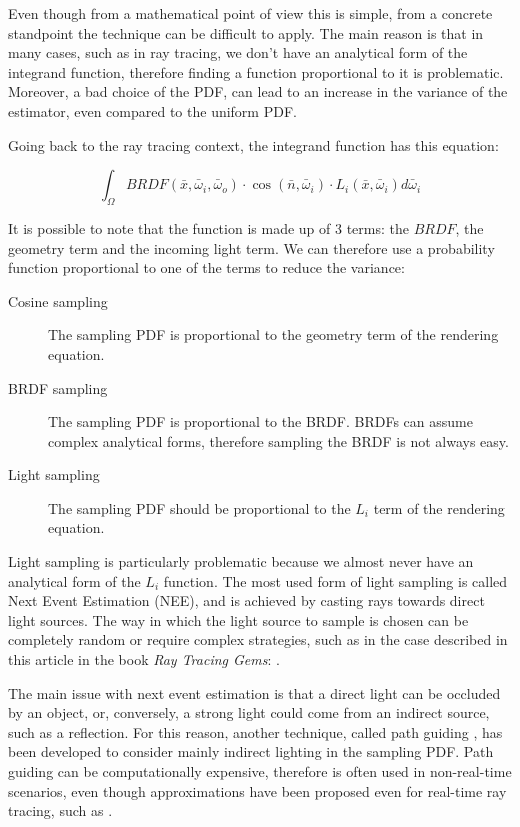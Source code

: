 \documentclass{PoliMi_MasterThesis}
\begin{document}
Even though from a mathematical point of view this is simple, from a concrete standpoint the technique can be difficult to apply. The main reason is that in many cases, such as in ray tracing, we don't have an analytical form of the integrand function, therefore finding a function proportional to it is problematic. Moreover, a bad choice of the PDF, can lead to an increase in the variance of the estimator, even compared to the uniform PDF.

Going back to the ray tracing context, the integrand function has this equation:

$$\int_\Omega BRDF(\bar{x}, \bar{\omega}_i, \bar{\omega}_o) \cdot \cos(\bar{n}, \bar{\omega}_i) \cdot L_i(\bar{x}, \bar{\omega}_i) d\bar{\omega}_i$$

It is possible to note that the function is made up of 3 terms: the $BRDF$, the geometry term and the incoming light term. We can therefore use a probability function proportional to one of the terms to reduce the variance:
\begin{description}
	\item[Cosine sampling] The sampling PDF is proportional to the geometry term of the rendering equation.
	\item[BRDF sampling] The sampling PDF is proportional to the BRDF. BRDFs can assume complex analytical forms, therefore sampling the BRDF is not always easy.
	\item[Light sampling] The sampling PDF should be proportional to the $L_i$ term of the rendering equation.
\end{description}

Light sampling is particularly problematic because we almost never have an analytical form of the $L_i$ function. The most used form of light sampling is called Next Event Estimation (NEE), and is achieved by casting rays towards direct light sources. The way in which the light source to sample is chosen can be completely random or require complex strategies, such as in the case described in this article in the book \textit{Ray Tracing Gems}: \cite{multi_light_sampling}.

The main issue with next event estimation is that a direct light can be occluded by an object, or, conversely, a strong light could come from an indirect source, such as a reflection. For this reason, another technique, called path guiding \cite{path_guiding}, has been developed to consider mainly indirect lighting in the sampling PDF. Path guiding can be computationally expensive, therefore is often used in non-real-time scenarios, even though approximations have been proposed even for real-time ray tracing, such as \cite{real_time_path_guiding}.
\end{document}
